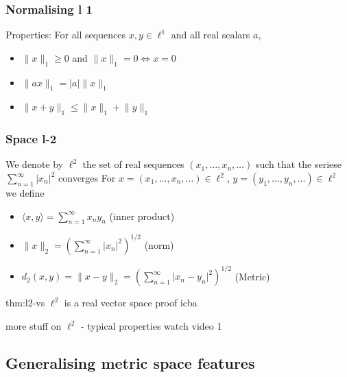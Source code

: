 \documentclass{article}
\begin{document}
\subsubsection{Normalising l 1}
Properties: For all sequences $x,y\in \ell^{1}$ and all real scalars $a$,
\begin{itemize}
    \item $\lVert x \rVert_{1}\ge 0$ and $\lVert x \rVert_{1} = 0 \iff x = 0$
    \item $\lVert ax \rVert_{1} = \lvert a \rvert \lVert x \rVert_{1}$
    \item $\lVert x + y \rVert_{1} \le \lVert x \rVert_{1} + \lVert y \rVert_{1}$
\end{itemize}

\subsubsection{Space l-2}
We denote by $\ell^{2}$ the set of real sequences $(x_{1}, \dots ,x_{n},\dots)$ such that the seriese $\displaystyle \sum_{n = 1}^{\infty} \lvert x_{n} \rvert^{2}$ converges
For $x = (x_{1}, \dots, x_{n}, \dots)\in \ell^{2}$, $y = (y_{1},\dots,y_{n},\dots)\in\ell^{2}$ we define
\begin{itemize}
    \item $\langle x,y \rangle = \sum_{n = 1}^{\infty}x_{n}y_{n}$ (inner product)
    \item $\lVert x \rVert_{2} = \displaystyle\left(\sum_{n = 1}^{\infty}\lvert x_{n} \rvert^{2}\right)^{1/2}$ (norm)
    \item $\displaystyle d_{2}(x,y) = \lVert x - y \rVert_{2} = \left(\sum_{n = 1}^{\infty} \lvert x_{n} - y_{n} \rvert^{2}\right)^{1/2}$ (Metric)
\end{itemize}

\begin{thm}[4]{thm:l2-vs}{}
    $\ell^{2}$ is a real vector space
    proof icba
\end{thm}

more stuff on $\ell^{2}$ - typical properties watch video 1

\subsection{Generalising metric space features}
\end{document}
